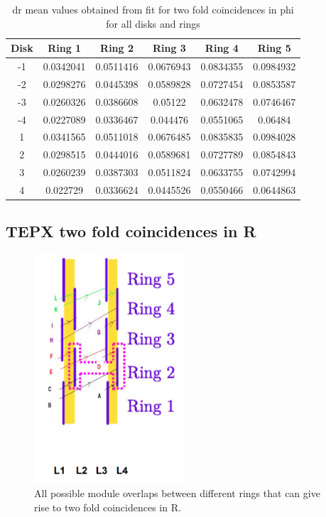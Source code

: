 \begin{table}[htbp]
  \centering
  \caption{dr mean values obtained from fit for two fold coincidences in phi for all disks and rings}
  \label{tab:mdr_cuts_offset_values}
  \begin{tabular}{cccccc}
    \textbf{Disk} & \textbf{Ring 1} & \textbf{Ring 2} & \textbf{Ring 3} & \textbf{Ring 4} & \textbf{Ring 5} \\
    \hline
    -1 & 0.0342041  & 0.0511416 & 0.0676943 & 0.0834355 & 0.0984932 \\
    -2 & 0.0298276  & 0.0445398 & 0.0589828 & 0.0727454 & 0.0853587 \\
    -3 & 0.0260326  & 0.0386608 & 0.05122   & 0.0632478 & 0.0746467 \\
    -4 & 0.0227089  & 0.0336467 & 0.044476  & 0.0551065 & 0.06484   \\
    1  & 0.0341565  & 0.0511018 & 0.0676485 & 0.0835835 & 0.0984028 \\
    2  & 0.0298515  & 0.0444016 & 0.0589681 & 0.0727789 & 0.0854843 \\
    3  & 0.0260239  & 0.0387303 & 0.0511824 & 0.0633755 & 0.0742994 \\
    4  & 0.022729   & 0.0336624 & 0.0445526 & 0.0550466 & 0.0644863 \\
  \end{tabular}
\end{table}


\subsection{TEPX two fold coincidences in R}


\begin{figure}[!htp]
\centering
\includegraphics[width=0.5\textwidth]{ashish_thesis/2foldinR.png}
\caption{%
  All possible module overlaps between different rings that can give rise to two fold coincidences in R.
}
\label{fig:cluster_ring}
\end{figure}


